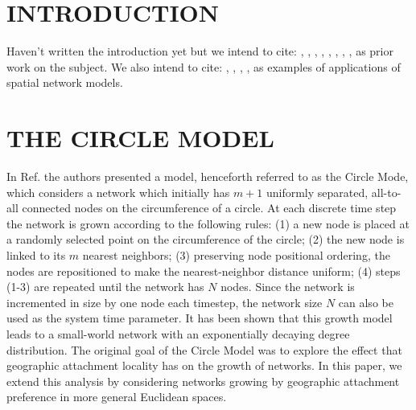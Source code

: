 \documentclass[aps,pre,reprint,superscriptaddress,amsmath,amssymb,nofootinbib]{revtex4-1}
\begin{document}

\maketitle

\section{INTRODUCTION}
Haven't written the introduction yet but we intend to cite:
\cite{wsnat}, \cite{ozik2004}, \cite{przuljgeo}, \cite{hermannspace}, \cite{bullockspatial}, \cite{guan1D}, \cite{zhang2006}, \cite{zhang2007}, \cite{newmanreview}  as prior work on the subject.
We also intend to cite:
\cite{neuronembedding}, \cite{plenzcascade}, \cite{fruitfly}, \cite{barthelemy}, \cite{vazquez2002} as examples of applications of spatial network models.

\section{THE CIRCLE MODEL}
In Ref. \cite{ozik2004} the authors presented a model, henceforth referred to as the Circle Mode, which considers a network which initially has $m+1$ uniformly separated, all-to-all connected nodes on the circumference of a circle. 
At each discrete time step the network is grown according to the following rules: 
(1) a new node is placed at a randomly selected point on the circumference of the circle;
(2) the new node is linked to its $m$ nearest neighbors;
(3) preserving node positional ordering, the nodes are repositioned to make the nearest-neighbor distance uniform;
(4) steps (1-3) are repeated until the network has $N$ nodes.
Since the network is incremented in size by one node each timestep, the network size $N$ can also be used as the system time parameter.  
It has been shown \cite{ozik2004} that this growth model leads to a small-world network with an exponentially decaying degree distribution. 
The original goal of the Circle Model was to explore the effect that geographic attachment locality has on the growth of networks.
In this paper, we extend this analysis by considering networks growing by geographic attachment preference in more general Euclidean spaces. 
\end{document}
